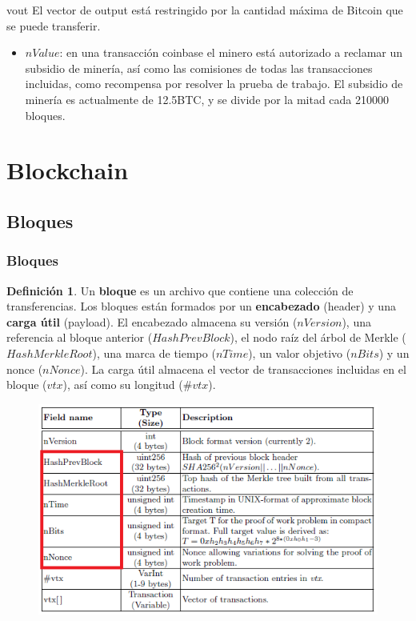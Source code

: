 \documentclass{beamer}
\theoremstyle{definition}
\newtheorem{defi}{Definición}
\begin{document}
\begin{frame}
	\begin{block}{vout}
		El vector de output está restringido por la cantidad máxima de Bitcoin que se puede transferir.
	\end{block}\pause

\begin{itemize}
	\item $nValue$: en una transacción coinbase el minero está autorizado a reclamar un subsidio de minería, así como las comisiones de todas las transacciones incluidas, como recompensa por resolver la prueba de trabajo. El subsidio de minería es actualmente de 12.5BTC, y se divide por la mitad cada 210000 bloques. 
\end{itemize}

\end{frame}

\section{Blockchain}
\subsection{Bloques}
\begin{frame}
	\frametitle{Bloques}
	\begin{defi}
		Un \textbf{bloque} es un archivo que contiene una colección de transferencias. Los bloques están formados por un \textbf{encabezado} (header) y una \textbf{carga útil} (payload). El encabezado almacena su versión ($nVersion$), una referencia al bloque anterior ($HashPrevBlock$), el nodo raíz del árbol de Merkle ($HashMerkleRoot$), una marca de tiempo ($nTime$), un valor objetivo ($nBits$) y un nonce ($nNonce$). La carga útil almacena el vector de transacciones incluidas en el bloque ($vtx$), así como su longitud ($\# vtx$).
	\end{defi}
\end{frame}

\begin{frame}
	
	\begin{figure}
		\includegraphics[scale=0.5]{bloque}
	\end{figure}
\end{frame}
\end{document}
